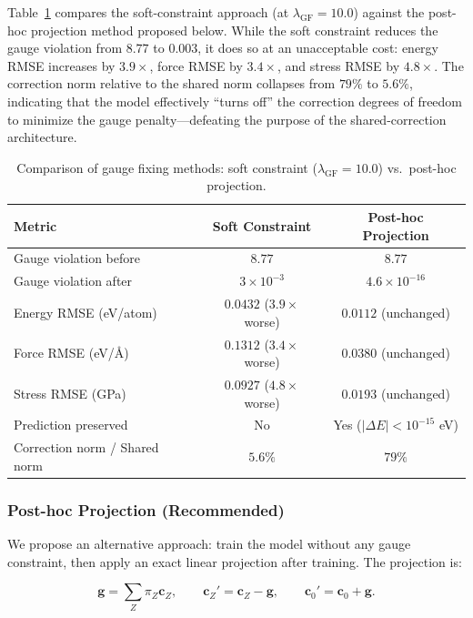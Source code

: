 \documentclass[twoside,prb,aps,floatfix,superscriptaddress,longbibliography]{revtex4-2}
\newcommand{\AAng}{\mbox{\AA}}
\begin{document}
Table~\ref{tab:gauge_methods} compares the soft-constraint approach (at $\lambda_{\mathrm{GF}} = 10.0$) against the post-hoc projection method proposed below. While the soft constraint reduces the gauge violation from $8.77$ to $0.003$, it does so at an unacceptable cost: energy RMSE increases by $3.9\times$, force RMSE by $3.4\times$, and stress RMSE by $4.8\times$. The correction norm relative to the shared norm collapses from $79\%$ to $5.6\%$, indicating that the model effectively ``turns off'' the correction degrees of freedom to minimize the gauge penalty---defeating the purpose of the shared-correction architecture.

\begin{table}[t]
\caption{Comparison of gauge fixing methods: soft constraint ($\lambda_{\mathrm{GF}} = 10.0$) vs.\ post-hoc projection.}
\label{tab:gauge_methods}
\begin{ruledtabular}
\begin{tabular}{lcc}
\toprule
Metric & Soft Constraint & Post-hoc Projection \\
\midrule
Gauge violation before & $8.77$ & $8.77$ \\
Gauge violation after & $3\times10^{-3}$ & $4.6\times10^{-16}$ \\
Energy RMSE (eV/atom) & $0.0432$ ($3.9\times$ worse) & $0.0112$ (unchanged) \\
Force RMSE (eV/\AAng) & $0.1312$ ($3.4\times$ worse) & $0.0380$ (unchanged) \\
Stress RMSE (GPa) & $0.0927$ ($4.8\times$ worse) & $0.0193$ (unchanged) \\
Prediction preserved & No & Yes ($|\Delta E| < 10^{-15}$ eV) \\
Correction norm / Shared norm & $5.6\%$ & $79\%$ \\
\bottomrule
\end{tabular}
\end{ruledtabular}
\end{table}

\subsubsection{Post-hoc Projection (Recommended)}

We propose an alternative approach: train the model without any gauge constraint, then apply an exact linear projection after training. The projection is:

\begin{equation}
\mathbf{g} = \sum_Z \pi_Z \mathbf{c}_Z, \qquad
\mathbf{c}_Z' = \mathbf{c}_Z - \mathbf{g}, \qquad
\mathbf{c}_0' = \mathbf{c}_0 + \mathbf{g}.
\label{eq:posthoc_projection}
\end{equation}
\end{document}
